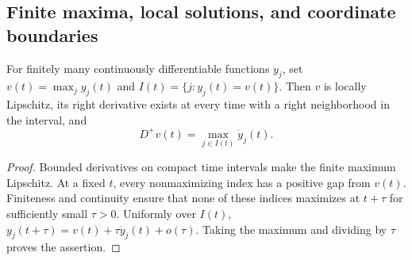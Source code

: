 \subsection{Finite maxima, local solutions, and coordinate boundaries}
\label{slot:P01-1}

\begin{lemma}
\label{lem:P01-max}
For finitely many continuously differentiable functions $y_j$, set
$v(t)=\max_j y_j(t)$ and $I(t)=\{j:y_j(t)=v(t)\}$.
Then $v$ is locally Lipschitz, its right derivative exists at every
time with a right neighborhood in the interval, and
\begin{equation}
\label{eq:P01-max}
 D^+v(t)=\max_{j\in I(t)}\dot y_j(t).
\end{equation}
\end{lemma}
\begin{proof}
Bounded derivatives on compact time intervals make the finite maximum
Lipschitz. At a fixed $t$, every nonmaximizing index has a positive gap
from $v(t)$. Finiteness and continuity ensure that none of these indices
maximizes at $t+\tau$ for sufficiently small $\tau>0$. Uniformly over
$I(t)$,
$y_j(t+\tau)=v(t)+\tau\dot y_j(t)+o(\tau)$.
Taking the maximum and dividing by $\tau$ proves the assertion.
\end{proof}

